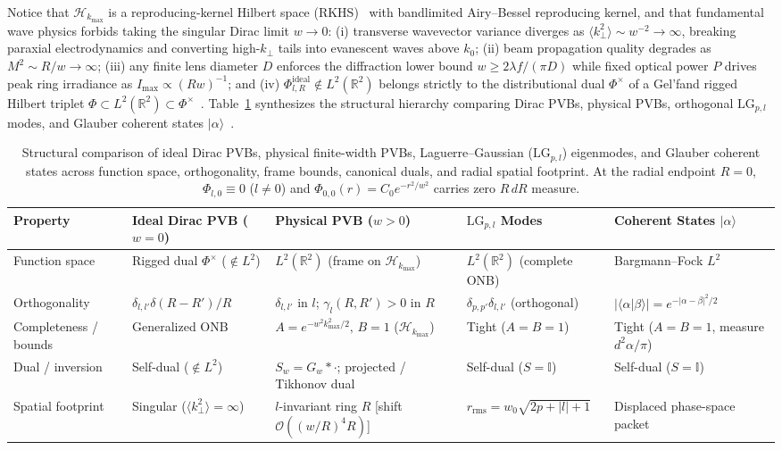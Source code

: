 \documentclass[aps,pra,reprint,nofootinbib,floatfix,longbibliography]{revtex4-2}
\theoremstyle{remark}
\newcommand{\braket}[2]{\langle #1 | #2 \rangle}
\newcommand{\ket}[1]{| #1 \rangle}
\newcommand{\abs}[1]{\lvert #1 \rvert}
\begin{document}
Notice that $\mathcal{H}_{k_{\max}}$ is a reproducing-kernel Hilbert space (RKHS)~\cite{PaulsenRaghupathi2016} with bandlimited Airy--Bessel reproducing kernel, and that fundamental wave physics forbids taking the singular Dirac limit $w \to 0$: (i) transverse wavevector variance diverges as $\langle k_\perp^2 \rangle \sim w^{-2} \to \infty$, breaking paraxial electrodynamics and converting high-$k_\perp$ tails into evanescent waves above $k_0$; (ii) beam propagation quality degrades as $M^2 \sim R/w \to \infty$; (iii) any finite lens diameter $D$ enforces the diffraction lower bound $w \ge 2\lambda f/(\pi D)$ while fixed optical power $P$ drives peak ring irradiance as $I_{\max} \propto (R w)^{-1}$; and (iv) $\Phi_{l,R}^{\mathrm{ideal}} \notin L^2(\mathbb{R}^2)$ belongs strictly to the distributional dual $\Phi^\times$ of a Gel'fand rigged Hilbert triplet $\Phi \subset L^2(\mathbb{R}^2) \subset \Phi^\times$~\cite{Gelfand1964}. Table~\ref{tab:frame_comparison} synthesizes the structural hierarchy comparing Dirac PVBs, physical PVBs, orthogonal $\mathrm{LG}_{p,l}$ modes, and Glauber coherent states $\ket{\alpha}$~\cite{Klauder1985,Perelomov1986,Gazeau2009}.

\begin{table}[t]
\caption{Structural comparison of ideal Dirac PVBs, physical finite-width PVBs, Laguerre--Gaussian ($\mathrm{LG}_{p,l}$) eigenmodes, and Glauber coherent states across function space, orthogonality, frame bounds, canonical duals, and radial spatial footprint. At the radial endpoint $R = 0$, $\Phi_{l,0} \equiv 0$ ($l \neq 0$) and $\Phi_{0,0}(r) = C_0 e^{-r^2/w^2}$ carries zero $R\,dR$ measure.}
\label{tab:frame_comparison}
\begin{ruledtabular}
\footnotesize
\begin{tabular}{p{2.3cm}p{3.4cm}p{4.6cm}p{3.3cm}p{3.2cm}}
Property & Ideal Dirac PVB ($w=0$) & Physical PVB ($w>0$) & $\mathrm{LG}_{p,l}$ Modes & Coherent States $\ket{\alpha}$ \\
\hline
Function space & Rigged dual $\Phi^\times$ ($\notin L^2$) & $L^2(\mathbb{R}^2)$ (frame on $\mathcal{H}_{k_{\max}}$) & $L^2(\mathbb{R}^2)$ (complete ONB) & Bargmann--Fock $L^2$ \\
Orthogonality & $\delta_{l,l'}\delta(R-R')/R$ & $\delta_{l,l'}$ in $l$; $\gamma_l(R,R') > 0$ in $R$ & $\delta_{p,p'}\delta_{l,l'}$ (orthogonal) & $\abs{\braket{\alpha}{\beta}} = e^{-\abs{\alpha-\beta}^2/2}$ \\
Completeness / bounds & Generalized ONB & $A = e^{-w^2 k_{\max}^2/2},\, B = 1$ ($\mathcal{H}_{k_{\max}}$) & Tight ($A = B = 1$) & Tight ($A = B = 1$, measure $d^2\alpha/\pi$) \\
Dual / inversion & Self-dual ($\notin L^2$) & $S_w = G_w * \cdot$; projected / Tikhonov dual & Self-dual ($S = \mathbb{I}$) & Self-dual ($S = \mathbb{I}$) \\
Spatial footprint & Singular ($\langle k_\perp^2\rangle = \infty$) & $l$-invariant ring $R$ [shift $\mathcal{O}((w/R)^4 R)$] & $r_{\mathrm{rms}} = w_0\sqrt{2p+\abs{l}+1}$ & Displaced phase-space packet \\
\end{tabular}
\end{ruledtabular}
\end{table}
\end{document}
